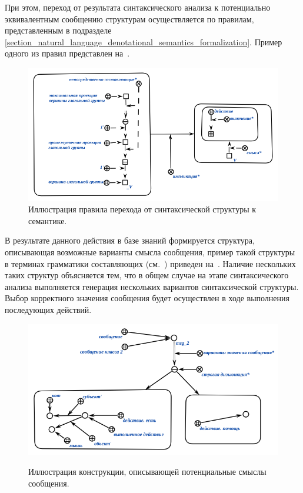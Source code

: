 При этом, переход от результата синтаксического анализа к потенциально эквивалентным сообщению структурам осуществляется по правилам, представленным в подразделе \ref{section_natural_language_denotational_semantics_formalization}.
Пример одного из правил представлен на~\textit{}.

\begin{figure}[h]
    \centering
    \includegraphics[scale=0.8]{images/part4/chapter_nl_interfaces/d_sem_3}
    \caption{Иллюстрация правила перехода от синтаксической структуры к семантике.}
    \label{fig:transition_to_semanic_rule}
\end{figure}

В результате данного действия в базе знаний формируется структура, описывающая возможные варианты смысла сообщения, пример такой структуры в терминах грамматики составляющих (см.~) приведен на~\textit{}.
Наличие нескольких таких структур объясняется тем, что в общем случае на этапе синтаксического анализа выполняется генерация нескольких вариантов синтаксической структуры.
Выбор корректного значения сообщения будет осуществлен в ходе выполнения последующих действий.

\begin{figure}[H]
    \centering
    \caption{Иллюстрация конструкции, описывающей потенциальные смыслы сообщения.}
    \includegraphics[scale=0.8]{images/part4/chapter_nl_interfaces/messsage_meaning_variants}
    \label{fig:messsage_meaning_variants}
\end{figure}

